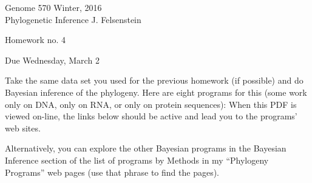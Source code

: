 \documentclass[12pt]{article}
\begin{document}
{\large
\noindent
Genome 570 \hfill Winter, 2016\\
Phylogenetic Inference \hfill J. Felsenstein\\
}

\vfill

\centerline{Homework no. 4}
\medskip

\centerline{Due Wednesday, March 2}
\bigskip

\noindent
Take the same data set you used for the previous homework (if
possible) and do Bayesian inference of the phylogeny.
Here are eight programs for this (some work only on DNA, only on RNA,
or only on protein sequences):  When this PDF is viewed on-line,
the links below should be active and lead you to the programs' web sites.

\hspace*{0in}

\noindent
Alternatively, you can explore the other Bayesian programs in the
Bayesian Inference section of the list of programs by Methods in my
``Phylogeny Programs'' web pages (use that phrase to find the pages).
\medskip
\end{document}
